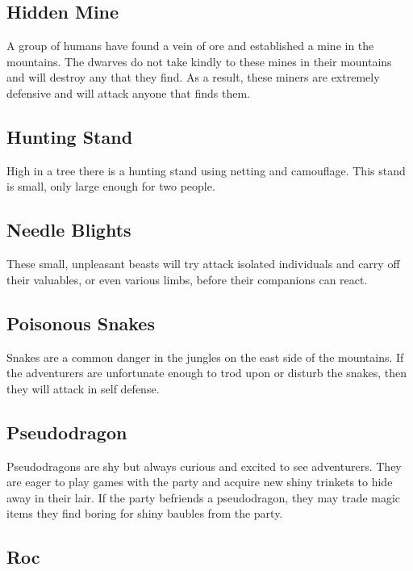 \subsection{Hidden Mine}

A group of humans have found a vein of ore and established a mine in the mountains.
The dwarves do not take kindly to these mines in their mountains and will destroy any that they find.
As a result, these miners are extremely defensive and will attack anyone that finds them.

\subsection{Hunting Stand}

High in a tree there is a hunting stand using netting and camouflage.
This stand is small, only large enough for two people.

\subsection{Needle Blights}

These small, unpleasant beasts will try attack isolated individuals and carry off their valuables, or even various limbs, before their companions can react.

\subsection{Poisonous Snakes}

Snakes are a common danger in the jungles on the east side of the mountains.
If the adventurers are unfortunate enough to trod upon or disturb the snakes, then they will attack in self defense.

\subsection{Pseudodragon}

Pseudodragons are shy but always curious and excited to see adventurers.
They are eager to play games with the party and acquire new shiny trinkets to hide away in their lair.
If the party befriends a pseudodragon, they may trade magic items they find boring for shiny baubles from the party.

\subsection{Roc}

